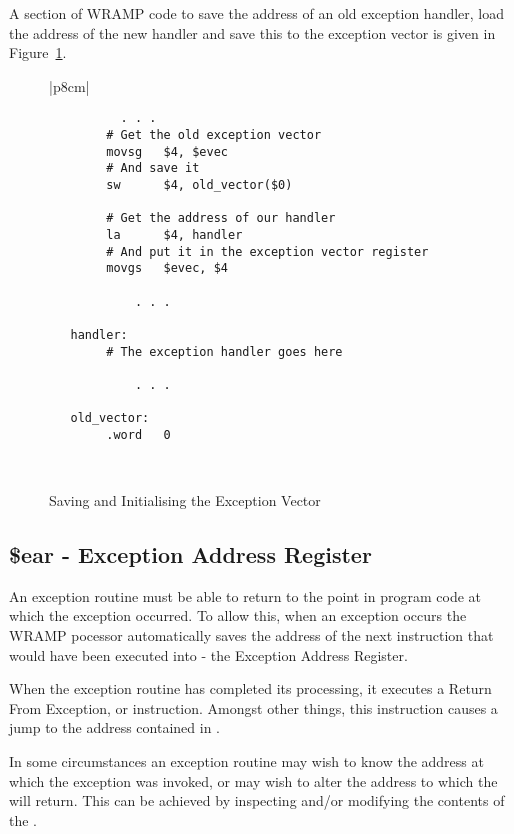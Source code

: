 A section of WRAMP code to save the address of an old exception
handler, load the address of the new handler and save this to the
exception vector is given in Figure~\ref{code:evec}.

\begin{figure}[h]
\begin{footnotesize}
\begin{center}
\begin{tabular}{|p{8cm}|}
\hline
\begin{verbatim}
          . . . 
        # Get the old exception vector
        movsg   $4, $evec
        # And save it
        sw      $4, old_vector($0)

        # Get the address of our handler
        la      $4, handler
        # And put it in the exception vector register
        movgs   $evec, $4

            . . .
	
   handler:
        # The exception handler goes here

            . . .

   old_vector:
        .word   0

\end{verbatim}
\\
\hline
\end{tabular}
\end{center}
\end{footnotesize}
\caption{Saving and Initialising the Exception Vector}
\label{code:evec}
\end{figure}

\subsection{\$ear - Exception Address Register}

An exception routine must be able to return to the point in program code at
which the exception occurred.  To allow this, when an exception occurs the
WRAMP pocessor automatically saves the address of the next instruction
that would have been executed into  - the Exception Address
Register.

When the exception routine has completed its processing, it executes a
Return From Exception, or  instruction. Amongst other things, this
instruction causes a jump to the address contained in .

In some circumstances an exception routine may wish to know the address at
which the exception was invoked, or may wish to alter the address to which
the  will return. This can be achieved by inspecting and/or modifying
the contents of the .

